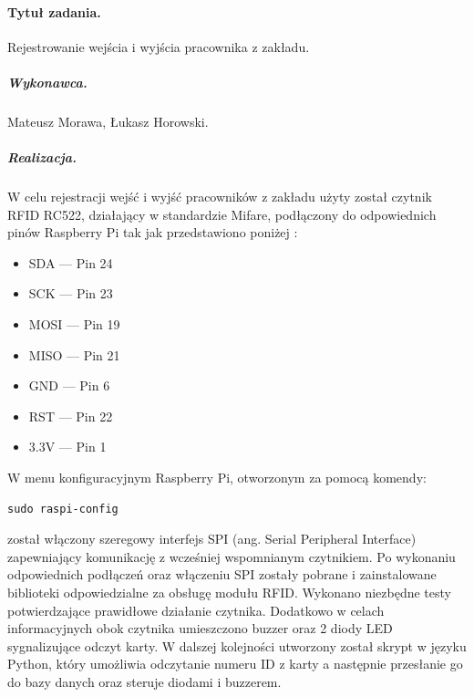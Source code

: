 \documentclass[a4paper]{article}
\begin{document}
\paragraph{Tytuł zadania.} Rejestrowanie wejścia i wyjścia pracownika z zakładu.
\subparagraph{Wykonawca.} Mateusz Morawa, Łukasz Horowski.
\subparagraph{Realizacja.} W celu rejestracji wejść i wyjść pracowników z zakładu użyty został czytnik RFID RC522, działający w standardzie Mifare, podłączony do odpowiednich pinów Raspberry Pi tak jak przedstawiono poniżej \cite{Rasp}:
\begin{itemize}
 \item  SDA   --- Pin 24
 \item  SCK   --- Pin 23
 \item  MOSI  --- Pin 19
 \item  MISO  --- Pin 21
 \item  GND   --- Pin 6
 \item  RST   --- Pin 22
 \item  3.3V  --- Pin 1
\end{itemize}
W  menu konfiguracyjnym Raspberry Pi, otworzonym za pomocą komendy:
\begin{verbatim}
sudo raspi-config
\end{verbatim}
został włączony szeregowy interfejs SPI (ang. Serial Peripheral Interface) zapewniający komunikację z wcześniej wspomnianym czytnikiem. Po wykonaniu odpowiednich podłączeń oraz włączeniu SPI zostały pobrane i zainstalowane biblioteki odpowiedzialne za obsługę modułu RFID. Wykonano niezbędne testy potwierdzające prawidłowe działanie czytnika. Dodatkowo w celach informacyjnych obok czytnika umieszczono buzzer oraz 2 diody LED sygnalizujące odczyt karty. W dalszej kolejności utworzony został skrypt w języku Python, który umożliwia  odczytanie numeru ID z karty a następnie przesłanie go do bazy danych oraz steruje diodami i buzzerem. 
\end{document}
